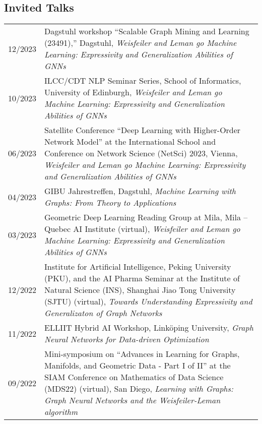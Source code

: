 \documentclass[10pt, a4paper, DIV=12, headings=small]{scrartcl}
\begin{document}
\subsection*{Invited Talks}
\begin{longtabu}{p{2.1cm}p{12.0cm}}
	
	12/2023 & Dagstuhl workshop ``Scalable Graph Mining and Learning (23491),'' Dagstuhl, \emph{Weisfeiler and Leman go Machine Learning: Expressivity and Generalization Abilities of GNNs}                                                                                                \\
	10/2023 & ILCC/CDT NLP Seminar Series, School of Informatics, University of Edinburgh, \emph{Weisfeiler and Leman go Machine Learning: Expressivity and Generalization Abilities of GNNs}\\    
	06/2023 & Satellite Conference ``Deep Learning with Higher-Order Network Model'' at the International School
	and Conference on Network Science (NetSci) 2023, Vienna, \emph{Weisfeiler and Leman go Machine Learning: Expressivity and Generalization Abilities of GNNs}\\                                                                                                                     
	04/2023 & GIBU Jahrestreffen, Dagstuhl, \emph{Machine Learning with Graphs: From Theory to Applications}                                                                                                                                                                                \\
	03/2023 & Geometric Deep Learning Reading Group at Mila, Mila -- Quebec AI Institute (virtual), \emph{Weisfeiler and Leman go Machine Learning: Expressivity and Generalization Abilities of GNNs}\\
	12/2022 & Institute for Artificial Intelligence, Peking University (PKU), and the AI Pharma Seminar at the Institute of Natural Science (INS), Shanghai Jiao Tong University (SJTU) (virtual), \emph{Towards Understanding Expressivity and Generalizaton of Graph Networks}            \\
	11/2022 & ELLIIT Hybrid AI Workshop, Linköping University, \emph{Graph Neural Networks for Data-driven Optimization}                                                                                                                                                                    \\
	09/2022 & Mini-symposium on ``Advances in Learning for Graphs, Manifolds, and Geometric Data - Part I of II'' at the SIAM Conference on Mathematics of Data Science (MDS22) (virtual), San Diego, \emph{Learning with Graphs: Graph Neural Networks and the Weisfeiler-Leman algorithm} \\

\end{longtabu}
\end{document}
